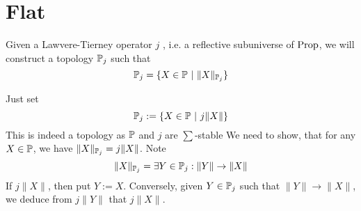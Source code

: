 \section{Flat}
Given a  Lawvere-Tierney operator $j$ , i.e. a reflective subuniverse of $\operatorname{Prop}$, we will construct a topology $\mathbb{P}_j$ such that %
\[
\mathbb{P}_j = \{ X \in \mathbb{P} \ | \ \| X \|_{\mathbb{P}_{j}} \}
\]
\begin{construction}

Just set 
\[\mathbb{P}_j := \{ X \in \mathbb{P} \ | \ j \|X \| \}	 \]
This is indeed a topology as $\mathbb{P}$ and $j$ are $\sum$-stable %
We need to show, that for any $X \in \mathbb{P}$, we have $\|X\|_{\mathbb{P}_j} = j\|X\|$.
Note
\[
\|X\|_{\mathbb{P}_j} = \exists Y \in \mathbb{P}_j : \|Y\| \to \|X\|
\]
If $j\|X\|$, then put $Y := X$. Conversely, given $Y \in \mathbb{P}_j$ such that $\|Y\| \to \|X\|$, we deduce from $j \|Y\|$ that $j\|X\|$.
\end{construction}
